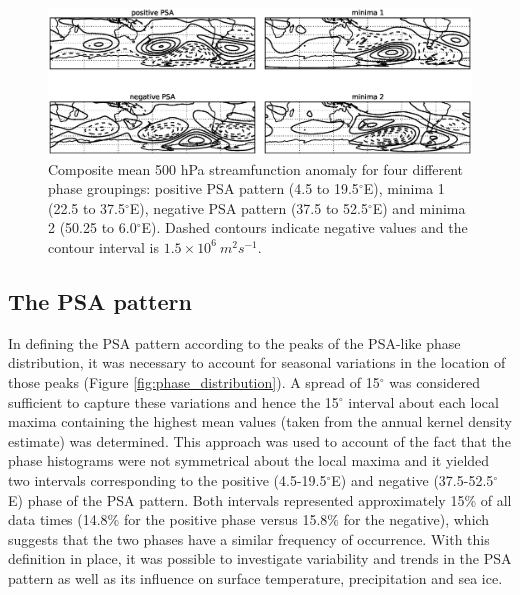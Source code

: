 \begin{figure}
\begin{center}
\includegraphics[width=1\columnwidth]{figures/psa/psa-phase-composites_wave6_ERAInterim_500hPa-lat10S10Nmean-lon115E235Ezeropad_030day-runmean-anom-wrt-all_native-np20N260E.eps}
\caption[Composite mean 500 hPa streamfunction anomaly for various phase groupings]{\label{fig:sf_composites}
Composite mean 500 hPa streamfunction anomaly for four different phase groupings: positive PSA pattern (4.5 to 19.5$^{\circ}$E), minima 1 (22.5 to 37.5$^{\circ}$E), negative PSA pattern (37.5 to 52.5$^{\circ}$E) and minima 2 (50.25 to 6.0$^{\circ}$E). Dashed contours indicate negative values and the contour interval is $1.5 \times 10^6 \: m^2 s^{-1}$.%
}
\end{center}
\end{figure}


\subsection{The PSA pattern}\label{s:psa_results}

In defining the PSA pattern according to the peaks of the PSA-like phase distribution, it was necessary to account for seasonal variations in the location of those peaks (Figure \ref{fig:phase_distribution}). A spread of 15$^{\circ}$ was considered sufficient to capture these variations and hence the 15$^{\circ}$ interval about each local maxima containing the highest mean values (taken from the annual kernel density estimate) was determined. This approach was used to account of the fact that the phase histograms were not symmetrical about the local maxima and it yielded two intervals corresponding to the positive (4.5-19.5$^{\circ}$E) and negative (37.5-52.5$^{\circ}$E) phase of the PSA pattern. Both intervals represented approximately 15\% of all data times (14.8\% for the positive phase versus 15.8\% for the negative), which suggests that the two phases have a similar frequency of occurrence. With this definition in place, it was possible to investigate variability and trends in the PSA pattern as well as its influence on surface temperature, precipitation and sea ice. 

